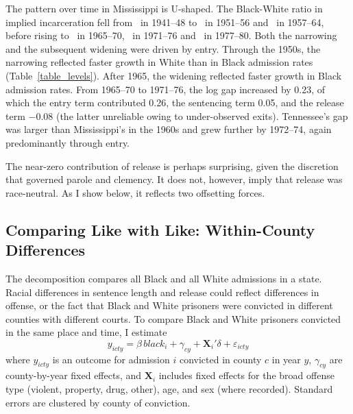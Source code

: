 \documentclass[12pt]{article}
\begin{document}
The pattern over time in Mississippi is U-shaped.  The Black-White ratio in implied incarceration fell from \unskip~in 1941--48 to \unskip~in 1951--56 and \unskip~in 1957--64, before rising to \unskip~in 1965--70, \unskip~in 1971--76 and \unskip~in 1977--80.  Both the narrowing and the subsequent widening were driven by entry.  Through the 1950s, the narrowing reflected faster growth in White than in Black admission rates (Table~\ref{table_levels}).  After 1965, the widening reflected faster growth in Black admission rates.  From 1965--70 to 1971--76, the log gap increased by 0.23, of which the entry term contributed 0.26, the sentencing term 0.05, and the release term $-0.08$ (the latter unreliable owing to under-observed exits).  Tennessee's gap was larger than Mississippi's in the 1960s and grew further by 1972--74, again predominantly through entry.

The near-zero contribution of release is perhaps surprising, given the discretion that governed parole and clemency.  It does not, however, imply that release was race-neutral.  As I show below, it reflects two offsetting forces.





\subsection*{Comparing Like with Like: Within-County Differences}

\noindent The decomposition compares all Black and all White admissions in a state.  Racial differences in sentence length and release could reflect differences in offense, or the fact that Black and White prisoners were convicted in different counties with different courts.  To compare Black and White prisoners convicted in the same place and time, I estimate
\begin{equation}
	y_{icty} = \beta \, black_{i} + \gamma_{cy} + \pmb{X}_{i}'\delta + \varepsilon_{icty}
	\label{equation_within}
\end{equation}
where $y_{icty}$ is an outcome for admission $i$ convicted in county $c$ in year $y$, $\gamma_{cy}$ are county-by-year fixed effects, and $\pmb{X}_{i}$ includes fixed effects for the broad offense type (violent, property, drug, other), age, and sex (where recorded).  Standard errors are clustered by county of conviction.
\end{document}
